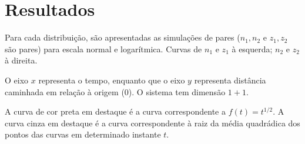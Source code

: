
\section{Resultados}

Para cada distribuição, são apresentadas as simulações de pares ($n_1, n_2$ e
$z_1, z_2$ são pares) para escala normal e logarítmica. Curvas de
$n_1$ e $z_1$ à esquerda; $n_2$ e $z_2$ à direita.

\vspace{5mm}
O eixo $x$ representa o tempo, enquanto que o eixo $y$ representa distância
caminhada em relação à origem (0). O sistema tem dimensão $1+1$.

\vspace{5mm}
A curva de cor preta em destaque é a curva correspondente a $f(t) = t^{1/2}$. A
curva cinza em destaque é a curva correspondente à raiz da média quadrádica dos
pontos das curvas em determinado instante $t$.
